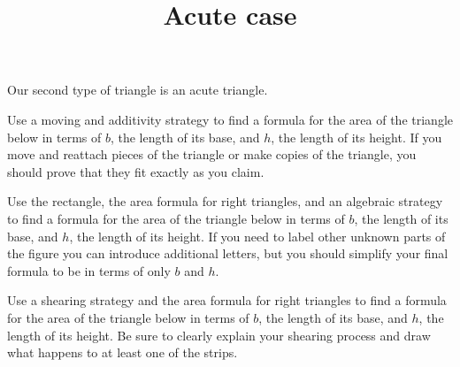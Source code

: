 \documentclass[nooutcomes,noauthor, handout]{ximera}
\title{Acute case}
\begin{document}
\begin{abstract}
\end{abstract}

\maketitle

Our second type of triangle is an acute triangle.

\begin{problem}
Use a moving and additivity strategy to find a formula for the area of the triangle below in terms of $b$, the length of its base, and $h$, the length of its height. If you move and reattach pieces of the triangle or make copies of the triangle, you should prove that they fit exactly as you claim.

\begin{image}
\end{image}
\end{problem} \vfill

\begin{problem}
Use the rectangle, the area formula for right triangles, and an algebraic strategy  to find a formula for the area of the triangle below in terms of $b$, the length of its base, and $h$, the length of its height. If you need to label other unknown parts of the figure you can introduce additional letters, but you should simplify your final formula to be in terms of only $b$ and $h$.

\begin{image}
\end{image}
\end{problem} \vfill

\newpage
\begin{problem}
Use a shearing strategy and the area formula for right triangles to find a formula for the area of the triangle below in terms of $b$, the length of its base, and $h$, the length of its height. Be sure to clearly explain your shearing process and draw what happens to at least one of the strips.

\begin{image}
\end{image}
\end{problem}
\end{document}
